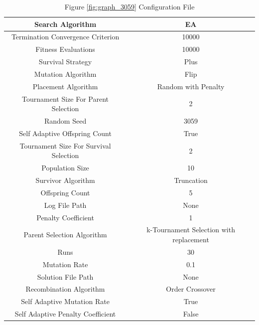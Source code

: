 \documentclass{standalone}
\begin{document}
\begin{table}[!htb]
	\centering
	\caption{Figure \ref{fig:graph_3059} Configuration File}
	\label{tab:graph_3059}
	\begin{tabular}{| c | c |}
		\hline
		Search Algorithm		& EA		 \\
		\hline
		Termination Convergence Criterion		& 10000		 \\
		\hline
		Fitness Evaluations		& 10000		 \\
		\hline
		Survival Strategy		& Plus		 \\
		\hline
		Mutation Algorithm		& Flip		 \\
		\hline
		Placement Algorithm		& Random with Penalty		 \\
		\hline
		Tournament Size For Parent Selection		& 2		 \\
		\hline
		Random Seed		& 3059		 \\
		\hline
		Self Adaptive Offspring Count		& True		 \\
		\hline
		Tournament Size For Survival Selection		& 2		 \\
		\hline
		Population Size		& 10		 \\
		\hline
		Survivor Algorithm		& Truncation		 \\
		\hline
		Offspring Count		& 5		 \\
		\hline
		Log File Path		& None		 \\
		\hline
		Penalty Coefficient		& 1		 \\
		\hline
		Parent Selection Algorithm		& k-Tournament Selection with replacement		 \\
		\hline
		Runs		& 30		 \\
		\hline
		Mutation Rate		& 0.1		 \\
		\hline
		Solution File Path		& None		 \\
		\hline
		Recombination Algorithm		& Order Crossover		 \\
		\hline
		Self Adaptive Mutation Rate		& True		 \\
		\hline
		Self Adaptive Penalty Coefficient		& False		 \\
		\hline
	\end{tabular}
\end{table}
\end{document}
